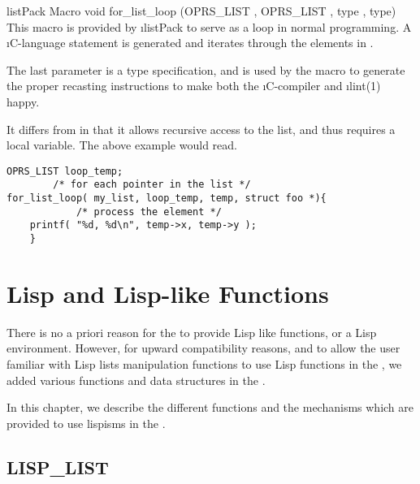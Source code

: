 \begin{typefn}{listPack Macro} {void} {for\_list\_loop} {(OPRS\_LIST , OPRS\_LIST
, type , type)}
This macro is provided by \i{listPack} to serve as a
 loop in normal programming. A \i{C}-language 
statement is generated and iterates  through the elements in
.

The last parameter is a type specification, and is used by the macro to
generate the proper recasting instructions to make both the \i{C}-compiler
and \i{lint(1)} happy.

It differs from  in that it allows recursive
access to the list, and thus requires a local variable.  The above example
would read.
\begin{verbatim}
OPRS_LIST loop_temp;
        /* for each pointer in the list */
for_list_loop( my_list, loop_temp, temp, struct foo *){
            /* process the element */
    printf( "%d, %d\n", temp->x, temp->y );
    }
\end{verbatim}
\end{typefn}

\chapter{Lisp and Lisp-like Functions}

There is no a priori reason for the \COPRSDE{} to provide Lisp like functions,
or a Lisp environment. However, for upward compatibility reasons, and to allow
the user familiar with Lisp lists manipulation functions to use Lisp functions
in the \CPK{}, we added various functions and data structures in the \COPRSDE{}.

In this chapter, we describe the different functions and the mechanisms which
are provided to use lispisms in the \COPRSDE{}.



\section{LISP\_LIST}


